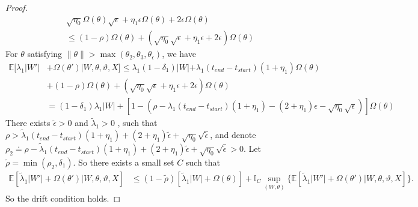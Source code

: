 \begin{proof}
\begin{align*}
  &\sqrt{\eta_0}\Omega(\theta) \sqrt{\epsilon} +  \eta_1 \epsilon \Omega(\theta) + 2\epsilon \Omega(\theta)\\
  & \leq (1 - \rho) \Omega(\theta) + (\sqrt{\eta_0} \sqrt{\epsilon} +  \eta_1 \epsilon + 2\epsilon) \Omega(\theta)
\end{align*}
For $\theta$ satisfying $ \parallel \theta \parallel >\max(\theta_2, \theta_3, \theta_\epsilon)$, we have %
\begin{align*}
\mathbb{E}[\lambda_1 | W'| &+ \Omega(\theta')| W, \theta, \vartheta, X] \le \lambda_1(1 - \delta_1)|W| + \lambda_1 (t_{end} - t_{start}) (1 + \eta_1)\Omega(\theta) \\
&+  (1 - \rho) \Omega(\theta) + (\sqrt{\eta_0} \sqrt{\epsilon} +  \eta_1 \epsilon + 2\epsilon) \Omega(\theta)\\
& = (1 - \delta_1)\lambda_1 |W| + [1 - (\rho - \lambda_1 (t_{end} - t_{start}) (1 + \eta_1) - (2 + \eta_1)\epsilon - \sqrt{\eta_0} \sqrt{\epsilon})]\Omega(\theta)
\end{align*}
There exists  $\tilde{\epsilon} > 0$ and $\tilde{\lambda}_1 >0 $ , such that $\rho >  \tilde{\lambda}_1 (t_{end} - t_{start}) (1 + \eta_1) + (2 + \eta_1)\tilde{\epsilon} + \sqrt{\eta_0} \sqrt{\tilde{\epsilon}}$, and denote $\rho_2  \doteq \rho - \tilde{\lambda}_1 (t_{end} - t_{start}) (1 + \eta_1) + (2 + \eta_1)\tilde{\epsilon} + \sqrt{\eta_0} \sqrt{\tilde{\epsilon}}
 > 0$. Let $\tilde{\rho} = \min(\rho_2, \delta_1)$. So there exists a small set $C$ such that \begin{align*}
\mathbb{E}[\tilde{\lambda}_1 | W'| + \Omega(\theta')| W, \theta, \vartheta, X] &\le (1 - \tilde{\rho}) [\tilde{\lambda}_1 | W| + \Omega(\theta)] +
\mathbb{I}_{C} \sup_{(W, \theta)} \{ \mathbb{E}[\tilde{\lambda}_1 | W'| + \Omega(\theta')| W, \theta, \vartheta, X] \}.
\end{align*}
So the drift condition holds.

\end{proof}
